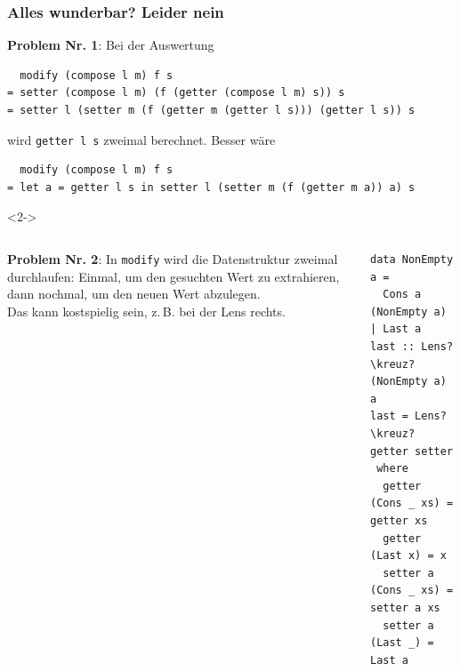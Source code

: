 \documentclass{beamer}
\newcommand{\kreuz}{$\,^\dag$} %
\newcommand{\hask}[1]{\texttt{#1}} %
\begin{document}
\begin{frame}[fragile]
  \frametitle{Alles wunderbar? Leider nein}

  \textbf{Problem Nr. 1}: Bei der Auswertung
\begin{verbatim}
  modify (compose l m) f s
= setter (compose l m) (f (getter (compose l m) s)) s
= setter l (setter m (f (getter m (getter l s))) (getter l s)) s
\end{verbatim}
  wird \hask{getter l s} zweimal berechnet.
  Besser wäre
\begin{verbatim}
  modify (compose l m) f s
= let a = getter l s in setter l (setter m (f (getter m a)) a) s
\end{verbatim}

  \begin{visibleenv}<2->
    \begin{columns}[t]

      \textbf{Problem Nr. 2}: In \hask{modify} wird die Datenstruktur zweimal durchlaufen: Einmal, um den gesuchten Wert zu extrahieren, dann nochmal, um den neuen Wert abzulegen. \\
      Das kann kostspielig sein, z.\,B. bei der Lens rechts.
\begin{verbatim}
data NonEmpty a =
  Cons a (NonEmpty a) | Last a
last :: Lens?\kreuz? (NonEmpty a) a
last = Lens?\kreuz? getter setter
 where
  getter (Cons _ xs) = getter xs
  getter (Last x) = x
  setter a (Cons _ xs) = setter a xs
  setter a (Last _) = Last a
\end{verbatim}
    \end{columns}
  \end{visibleenv}
\end{frame}
\end{document}
